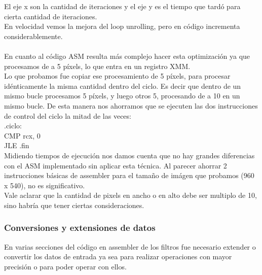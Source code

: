 El eje x son la cantidad de iteraciones y el eje y es el tiempo que tard\'o para cierta cantidad de iteraciones.\\
En velocidad vemos la mejora del loop unrolling, pero en c\'odigo incrementa considerablemente.\\\\

En cuanto al c\'odigo ASM resulta m\'as complejo hacer esta optimizaci\'on ya que procesamos de a 5 p\'ixels, lo que entra en un registro XMM.\\
Lo que probamos fue copiar ese procesamiento de 5 p\'ixels, para procesar id\'enticamente la misma cantidad dentro del ciclo. Es decir que dentro de un mismo bucle procesamos 5 p\'ixels, y luego otros 5, procesando de a 10 en un mismo bucle. De esta manera nos ahorramos que se ejecuten las dos instrucciones de control del ciclo la mitad de las veces:\\

.ciclo:\\
CMP rcx, 0\\
JLE .fin\\

Midiendo tiempos de ejecuci\'on nos damos cuenta que no hay grandes diferencias con el ASM implementado sin aplicar esta t\'ecnica. Al parecer ahorrar 2 instrucciones b\'asicas de assembler para el tamaño de im\'agen que probamos (960 x 540), no es significativo.\\
Vale aclarar que la cantidad de pixels en ancho o en alto debe ser multiplo de 10, sino habr\'ia que tener ciertas consideraciones.

\subsubsection{Conversiones y extensiones de datos}
En varias secciones del c\'odigo en assembler de los filtros fue necesario extender o convertir los datos de entrada ya sea para realizar operaciones con
mayor precisi\'on o para poder operar con ellos.\newline

